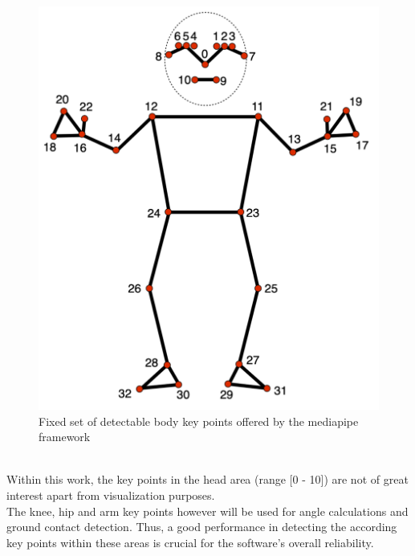 \begin{figure}[!h]
    \centering
    \includegraphics[scale=0.3]{figures/body_key_points.png}
    \caption[Set of detectable body key points]
    {Fixed set of detectable body key points offered by the mediapipe framework
    \cite{mediapipe_framework}}
    \label{fig:2_body_keypoints}
\end{figure}\\
Within this work, the key points in the head area (range [0 - 10]) are not of 
great interest apart from visualization purposes.\\
The knee, hip and arm key points however will be used for angle 
calculations and ground contact detection.
Thus, a good performance in detecting the according key points within these 
areas is crucial for the software's overall reliability.

